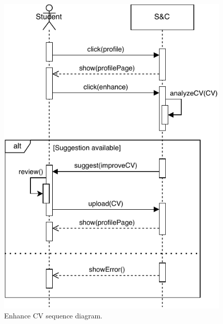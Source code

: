 \begin{figure}[H]
    \begin{center}
        \includegraphics[width=\textwidth, keepaspectratio]{Images/SequenceDiagram/EnhanceCVSD.pdf}
        \caption{Enhance CV sequence diagram.}
        \label{fig:enhance_cv_seqdiag}%
    \end{center}
\end{figure}



